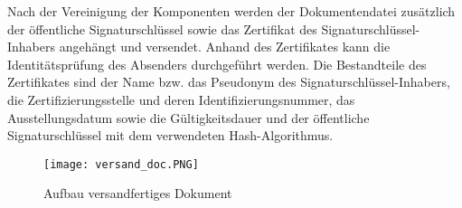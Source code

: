 Nach der Vereinigung der Komponenten werden der Dokumentendatei zusätzlich der öffentliche Signaturschlüssel sowie das Zertifikat des Signaturschlüssel-Inhabers angehängt und versendet. Anhand des Zertifikates kann die Identitätsprüfung des Absenders durchgeführt werden. Die Bestandteile des Zertifikates sind der Name bzw. das Pseudonym des Signaturschlüssel-Inhabers, die Zertifizierungsstelle und deren Identifizierungsnummer, das Ausstellungsdatum sowie die Gültigkeitsdauer und der öffentliche Signaturschlüssel mit dem verwendeten Hash-Algorithmus. \cite{techno1}\cite{techno4}
\begin{figure}[!ht]
    \centering
    \texttt{[image: versand\_doc.PNG]}
    \caption[Aufbau versandfertiges Dokument]{\small{Aufbau versandfertiges Dokument \cite{techno6}}}
\end{figure}